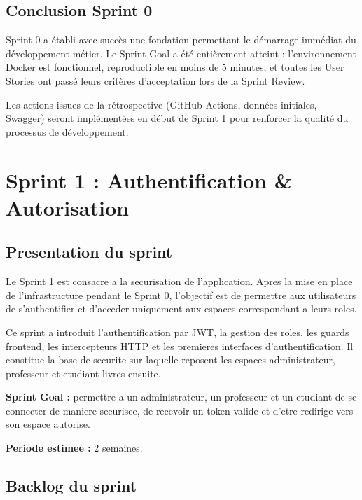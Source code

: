 \documentclass[12pt,a4paper]{report}
\begin{document}
\section{Conclusion Sprint 0}

Sprint 0 a établi avec succès une fondation permettant le démarrage immédiat du développement métier. Le Sprint Goal a été entièrement atteint : l'environnement Docker est fonctionnel, reproductible en moins de 5 minutes, et toutes les User Stories ont passé leurs critères d'acceptation lors de la Sprint Review.

Les actions issues de la rétrospective (GitHub Actions, données initiales, Swagger) seront implémentées en début de Sprint 1 pour renforcer la qualité du processus de développement.

\fi

\newpage
\chapter{Sprint 1 : Authentification \& Autorisation}

\section{Presentation du sprint}

Le Sprint 1 est consacre a la securisation de l'application. Apres la mise en place de l'infrastructure pendant le Sprint 0, l'objectif est de permettre aux utilisateurs de s'authentifier et d'acceder uniquement aux espaces correspondant a leurs roles.

Ce sprint a introduit l'authentification par JWT, la gestion des roles, les guards frontend, les intercepteurs HTTP et les premieres interfaces d'authentification. Il constitue la base de securite sur laquelle reposent les espaces administrateur, professeur et etudiant livres ensuite.

\textbf{Sprint Goal :} permettre a un administrateur, un professeur et un etudiant de se connecter de maniere securisee, de recevoir un token valide et d'etre redirige vers son espace autorise.

\textbf{Periode estimee :} 2 semaines.

\section{Backlog du sprint}
\end{document}
